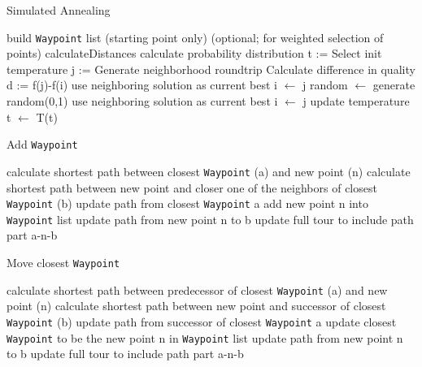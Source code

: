 \begin{breakablealgorithm}
	\caption{Simulated Annealing}
	\label{alg:SAImplementation}
	\begin{algorithmic}[1]
		\STATE build \texttt{Waypoint} list (starting point only)
		\STATE (optional; for weighted selection of points) calculateDistances
		\STATE calculate probability distribution
		\STATE t := Select init temperature
		\STATE j := Generate neighborhood roundtrip
		\STATE Calculate difference in quality d := f(j)-f(i)
		\STATE use neighboring solution as current best i $\gets$ j
		\ELSE 
		\STATE random $\gets$ generate random(0,1)
		\STATE use neighboring solution as current best i $\gets$ j
		\ENDIF
		\ENDIF
		\ENDFOR
		\STATE update temperature t $\gets$ T(t)
		\ENDFOR
	\end{algorithmic}
\end{breakablealgorithm}



\begin{breakablealgorithm}
	\caption{Add \texttt{Waypoint}}
	\label{alg:SAGenerateNeigborhoodAdd}
	\begin{algorithmic}[1]
		\STATE calculate shortest path between closest \texttt{Waypoint} (a) and new point (n)
		\STATE calculate shortest path between new point and closer one of the neighbors of closest \texttt{Waypoint} (b)
		\STATE update path from closest \texttt{Waypoint} a
		\STATE add new point n into \texttt{Waypoint} list
		\STATE update path from new point n to b
		\STATE update full tour to include path part a-n-b
	\end{algorithmic}
\end{breakablealgorithm}

\begin{breakablealgorithm}
	\caption{Move closest \texttt{Waypoint}}
	\label{alg:SAGenerateNeigborhoodMove}
	\begin{algorithmic}[1]
		\STATE calculate shortest path between predecessor of closest \texttt{Waypoint} (a) and new point (n)
		\STATE calculate shortest path between new point and successor of closest \texttt{Waypoint} (b)
		\STATE update path from successor of closest \texttt{Waypoint} a
		\STATE update closest \texttt{Waypoint} to be the new point n in \texttt{Waypoint} list
		\STATE update path from new point n to b
		\STATE update full tour to include path part a-n-b
	\end{algorithmic}
\end{breakablealgorithm}


